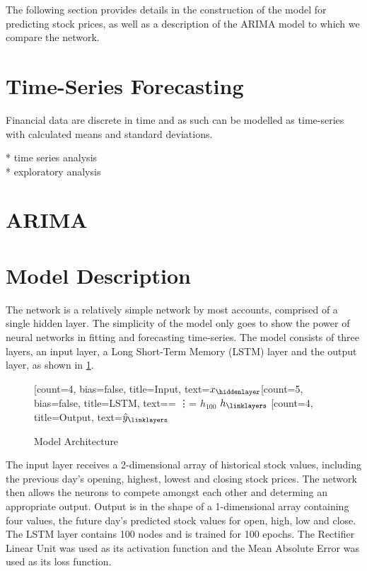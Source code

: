 The following section provides details in the construction of the model for predicting stock prices, as well as a description of the ARIMA model to which we compare the network.

\section{Time-Series Forecasting}
Financial data are discrete in time and as such can be modelled as time-series with calculated means and standard deviations.

* time series analysis\\
* exploratory analysis
\section{ARIMA}


\section{Model Description}
The network is a relatively simple network by most accounts, comprised of a single hidden layer. The simplicity of the model only goes to show the power of neural networks in fitting and forecasting time-series. The model consists of three layers, an input layer, a Long Short-Term Memory (LSTM) layer and the output layer, as shown in \ref{tab:model_arch}.

\begin{figure}[h]
    \centering
    \begin{neuralnetwork}[height=4]
        \newcommand{\x}[2]{$x_#2$}
        \newcommand{\y}[2]{$\hat{y}_#2$}
        \newcommand{\h}[2]{$h_#2$}
        \newcommand{\hlast}[2]{\ifnum4=#2 \vdots \else \ifnum5=#2 $h_{100}$ \else $h_#2$ \fi \fi}
        [count=4, bias=false, title=Input, text=\x]
        \hiddenlayer[count=5, bias=false, title=LSTM, text=\hlast] \linklayers
        \outputlayer[count=4, title=Output, text=\y] 
        \linklayers
    \end{neuralnetwork}
    \caption{Model Architecture}
    \label{tab:model_arch}
\end{figure}

The input layer receives a 2-dimensional array of historical stock values, including the previous day's opening, highest, lowest and closing stock prices. The network then allows the neurons to compete amongst each other and determing an appropriate output. Output is in the shape of a 1-dimensional array containing four values, the future day's predicted stock values for open, high, low and close. The LSTM layer contains 100 nodes and is trained for 100 epochs. The Rectifier Linear Unit was used as its activation function and the Mean Absolute Error was used as its loss function.


